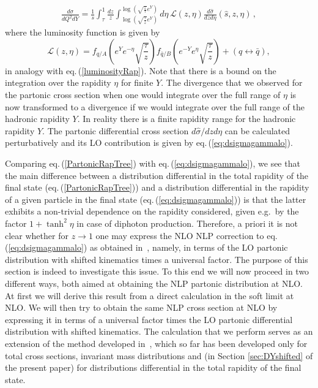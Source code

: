 \documentclass[11pt]{article}
\newcommand\eqn[1]     {eq.\,(\ref{#1})}
\begin{document}
\begin{align}
\label{HadronicDiphoton}
\frac{d\sigma}{dQ^2dY}=\frac{1}{s}\int_\tau^1\frac{dz}{z}\int_{\log\left(\sqrt{\frac{\tau}{z}}e^Y\right)}^{\log\left(\sqrt{\frac{z}{\tau}}e^Y\right)} d\eta\, \mathcal{L}(z,\eta)\frac{d\hat{\sigma}}{dzd\eta}(\hat{s},z,\eta)\,,
\end{align}
where the luminosity function is given by
\begin{equation}
    \mathcal{L}(z,\eta) =f_{q/A}\left(e^{Y}e^{-\eta}\sqrt{\frac{\tau}{z}}\right)f_{\bar{q}/B}\left(e^{-Y}e^{\eta}\sqrt{\frac{\tau}{z}}\right)+(q\leftrightarrow \bar{q}),
\end{equation}
in analogy with \eqn{luminosityRap}. Note that there 
is a bound on the integration over the rapidity $\eta$ 
for finite $Y$. The divergence that we observed for 
the partonic cross section when one would integrate 
over the full range of $\eta$ is now transformed to a 
divergence if we would integrate over the full range 
of the hadronic rapidity $Y$. In reality there 
is a finite rapidity range for the hadronic rapidity 
$Y$. The partonic differential cross section 
$d\hat{\sigma}/dzd\eta$ can be calculated 
perturbatively and its LO contribution is 
given by \eqn{eq:dsigmagammalo}.

Comparing \eqn{PartonicRapTree}
with \eqn{eq:dsigmagammalo}, we see that 
the main difference between a distribution 
differential in the total rapidity of the final 
state (\eqn{PartonicRapTree}) and a distribution 
differential in the rapidity of a given particle 
in the final state (\eqn{eq:dsigmagammalo}) is 
that the latter exhibits a non-trivial dependence 
on the rapidity considered, given e.g.\ by 
the factor $1+\tanh^2\eta$ in case of diphoton 
production. Therefore, a priori it is not clear 
whether for $z\to 1$ one may express 
the NLO NLP correction to \eqn{eq:dsigmagammalo} 
as obtained in~\cite{DelDuca:2017twk}, namely, in terms of the 
LO partonic distribution with shifted kinematics 
times a universal factor. The purpose of this section 
is indeed to investigate this issue. To this end
we will now proceed in two different ways, both 
aimed at obtaining the NLP partonic distribution 
at NLO. At first we will 
derive this result from a direct calculation in the 
soft limit at NLO. We will then try to obtain the 
same NLP cross section at NLO by expressing it 
in terms of a universal factor times the LO partonic 
differential distribution with shifted kinematics. 
The calculation that we perform serves as an 
extension of the method developed 
in~\cite{DelDuca:2017twk}, which so far 
has been developed only for total cross 
sections, invariant mass distributions 
and (in Section \ref{sec:DYshifted} of the
present paper) for distributions differential 
in the total rapidity of the final state.
\end{document}
